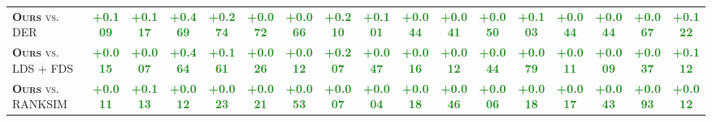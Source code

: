 \begin{table*}[h]
\begin{center}
{\begin{tabular}{l|cccc|cccc|cccc|cccc}
\textsc{\textbf{Ours} vs. DER} & \textcolor{ForestGreen}{\textbf{+0.109}} & \textcolor{ForestGreen}{\textbf{+0.117}} & \textcolor{ForestGreen}{\textbf{+0.469}} & \textcolor{ForestGreen}{\textbf{+0.274}} & \textcolor{ForestGreen}{\textbf{+0.072}} & \textcolor{ForestGreen}{\textbf{+0.066}} & \textcolor{ForestGreen}{\textbf{+0.210}} & \textcolor{ForestGreen}{\textbf{+0.101}} & \textcolor{ForestGreen}{\textbf{+0.044}} & \textcolor{ForestGreen}{\textbf{+0.041}} & \textcolor{ForestGreen}{\textbf{+0.050}} & \textcolor{ForestGreen}{\textbf{+0.103}} & \textcolor{ForestGreen}{\textbf{+0.044}} & \textcolor{ForestGreen}{\textbf{+0.044}} & \textcolor{ForestGreen}{\textbf{+0.067}} & \textcolor{ForestGreen}{\textbf{+0.122}} \\[1.5pt]
\textsc{\textbf{Ours} vs. LDS + FDS} & \textcolor{ForestGreen}{\textbf{+0.015}} & \textcolor{ForestGreen}{\textbf{+0.007}} & \textcolor{ForestGreen}{\textbf{+0.464}} & \textcolor{ForestGreen}{\textbf{+0.161}} & \textcolor{ForestGreen}{\textbf{+0.026}} & \textcolor{ForestGreen}{\textbf{+0.012}} & \textcolor{ForestGreen}{\textbf{+0.207}} & \textcolor{ForestGreen}{\textbf{+0.047}} & \textcolor{ForestGreen}{\textbf{+0.016}} & \textcolor{ForestGreen}{\textbf{+0.012}} & \textcolor{ForestGreen}{\textbf{+0.044}} & \textcolor{ForestGreen}{\textbf{+0.079}} & \textcolor{ForestGreen}{\textbf{+0.011}} & \textcolor{ForestGreen}{\textbf{+0.009}} & \textcolor{ForestGreen}{\textbf{+0.037}} & \textcolor{ForestGreen}{\textbf{+0.112}} \\[1.5pt]
\textsc{\textbf{Ours} vs. RANKSIM} & \textcolor{ForestGreen}{\textbf{+0.011}} & \textcolor{ForestGreen}{\textbf{+0.113}} & \textcolor{ForestGreen}{\textbf{+0.012}} & \textcolor{ForestGreen}{\textbf{+0.023}} & \textcolor{ForestGreen}{\textbf{+0.021}} & \textcolor{ForestGreen}{\textbf{+0.053}} & \textcolor{ForestGreen}{\textbf{+0.007}} & \textcolor{ForestGreen}{\textbf{+0.004}} & \textcolor{ForestGreen}{\textbf{+0.018}} & \textcolor{ForestGreen}{\textbf{+0.046}} & \textcolor{ForestGreen}{\textbf{+0.006}} & \textcolor{ForestGreen}{\textbf{+0.018}} & \textcolor{ForestGreen}{\textbf{+0.017}} & \textcolor{ForestGreen}{\textbf{+0.043}} & \textcolor{ForestGreen}{\textbf{+0.093}} & \textcolor{ForestGreen}{\textbf{+0.012}} \\
\bottomrule[1.5pt]
\end{tabular}}
\end{center}
\vspace{-0.7cm}
\end{table*} 
%
